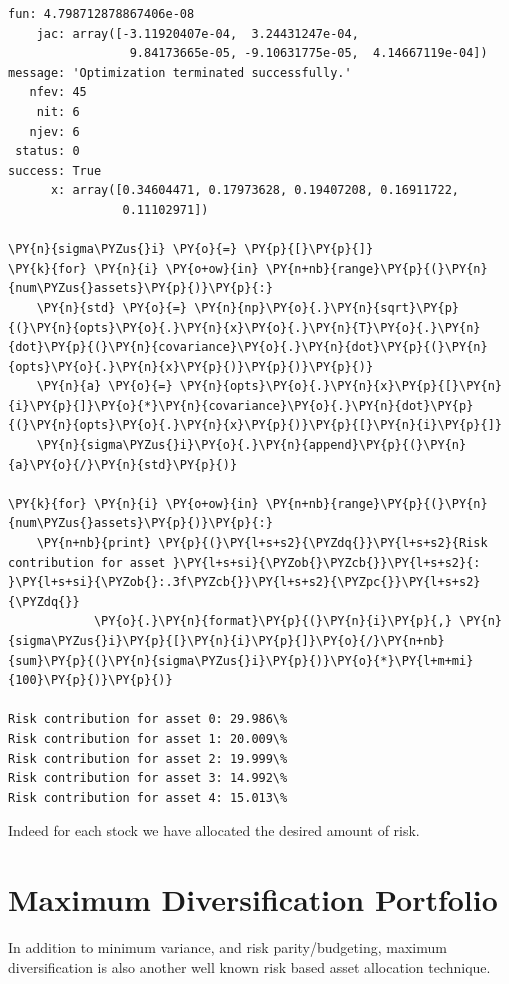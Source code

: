 \begin{tcolorbox}[breakable, size=fbox, boxrule=1pt, pad at break*=1mm,colback=cellbackground, colframe=cellborder]
\begin{Verbatim}[commandchars=\\\{\}]
    fun: 4.798712878867406e-08
    jac: array([-3.11920407e-04,  3.24431247e-04,  
                 9.84173665e-05, -9.10631775e-05,  4.14667119e-04])
message: 'Optimization terminated successfully.'
   nfev: 45
    nit: 6
   njev: 6
 status: 0
success: True
      x: array([0.34604471, 0.17973628, 0.19407208, 0.16911722, 
                0.11102971])
		
\PY{n}{sigma\PYZus{}i} \PY{o}{=} \PY{p}{[}\PY{p}{]}
\PY{k}{for} \PY{n}{i} \PY{o+ow}{in} \PY{n+nb}{range}\PY{p}{(}\PY{n}{num\PYZus{}assets}\PY{p}{)}\PY{p}{:}
    \PY{n}{std} \PY{o}{=} \PY{n}{np}\PY{o}{.}\PY{n}{sqrt}\PY{p}{(}\PY{n}{opts}\PY{o}{.}\PY{n}{x}\PY{o}{.}\PY{n}{T}\PY{o}{.}\PY{n}{dot}\PY{p}{(}\PY{n}{covariance}\PY{o}{.}\PY{n}{dot}\PY{p}{(}\PY{n}{opts}\PY{o}{.}\PY{n}{x}\PY{p}{)}\PY{p}{)}\PY{p}{)} 
    \PY{n}{a} \PY{o}{=} \PY{n}{opts}\PY{o}{.}\PY{n}{x}\PY{p}{[}\PY{n}{i}\PY{p}{]}\PY{o}{*}\PY{n}{covariance}\PY{o}{.}\PY{n}{dot}\PY{p}{(}\PY{n}{opts}\PY{o}{.}\PY{n}{x}\PY{p}{)}\PY{p}{[}\PY{n}{i}\PY{p}{]} 
    \PY{n}{sigma\PYZus{}i}\PY{o}{.}\PY{n}{append}\PY{p}{(}\PY{n}{a}\PY{o}{/}\PY{n}{std}\PY{p}{)}
		
\PY{k}{for} \PY{n}{i} \PY{o+ow}{in} \PY{n+nb}{range}\PY{p}{(}\PY{n}{num\PYZus{}assets}\PY{p}{)}\PY{p}{:}
    \PY{n+nb}{print} \PY{p}{(}\PY{l+s+s2}{\PYZdq{}}\PY{l+s+s2}{Risk contribution for asset }\PY{l+s+si}{\PYZob{}\PYZcb{}}\PY{l+s+s2}{: }\PY{l+s+si}{\PYZob{}:.3f\PYZcb{}}\PY{l+s+s2}{\PYZpc{}}\PY{l+s+s2}{\PYZdq{}}
            \PY{o}{.}\PY{n}{format}\PY{p}{(}\PY{n}{i}\PY{p}{,} \PY{n}{sigma\PYZus{}i}\PY{p}{[}\PY{n}{i}\PY{p}{]}\PY{o}{/}\PY{n+nb}{sum}\PY{p}{(}\PY{n}{sigma\PYZus{}i}\PY{p}{)}\PY{o}{*}\PY{l+m+mi}{100}\PY{p}{)}\PY{p}{)}
		
Risk contribution for asset 0: 29.986\%
Risk contribution for asset 1: 20.009\%
Risk contribution for asset 2: 19.999\%
Risk contribution for asset 3: 14.992\%
Risk contribution for asset 4: 15.013\%
\end{Verbatim}
\end{tcolorbox}

Indeed for each stock we have allocated the desired amount of risk.

\section{Maximum Diversification Portfolio}
\label{maximum-diversification-portfolio}

In addition to minimum variance, and risk parity/budgeting, maximum diversification is also another well known risk based asset allocation technique.

